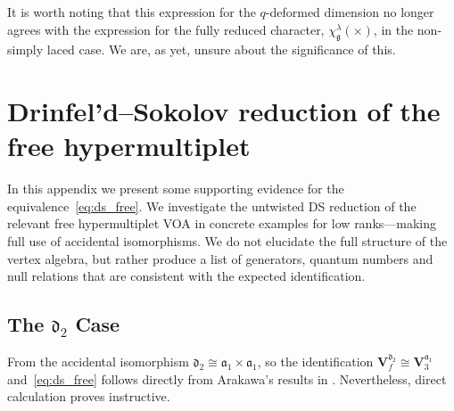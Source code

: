 \documentclass[a4paper]{article}
\def\af{\mathfrak{a}}
\def\df{\mathfrak{d}}
\def\gf{\mathfrak{g}}
\def\V{\mathbf{V}}
\begin{document}
It is worth noting that this expression for the $q$-deformed dimension no longer agrees with the expression for the fully reduced character, $\chi^\lambda_\gf(\times)$, in the non-simply laced case. We are, as yet, unsure about the significance of this.

\section{\label{app:ds_free}Drinfel'd--Sokolov reduction of the free hypermultiplet}

In this appendix we present some supporting evidence for the equivalence~\eqref{eq:ds_free}. We investigate the untwisted DS reduction of the relevant free hypermultiplet VOA in concrete examples for low ranks---making full use of accidental isomorphisms. We do not elucidate the full structure of the vertex algebra, but rather produce a list of generators, quantum numbers and null relations that are consistent with the expected identification.

\subsection{\label{subsec:D2_DS}The \texorpdfstring{$\df_2$}{d2} Case}

From the accidental isomorphism $\df_2\cong \af_1\times \af_1$, so the identification $\V_f^{\df_2}\cong \V_3^{\af_1}$ and~\eqref{eq:ds_free} follows directly from Arakawa's results in \cite{Arakawa2017introduction}. Nevertheless, direct calculation proves instructive.
\end{document}
